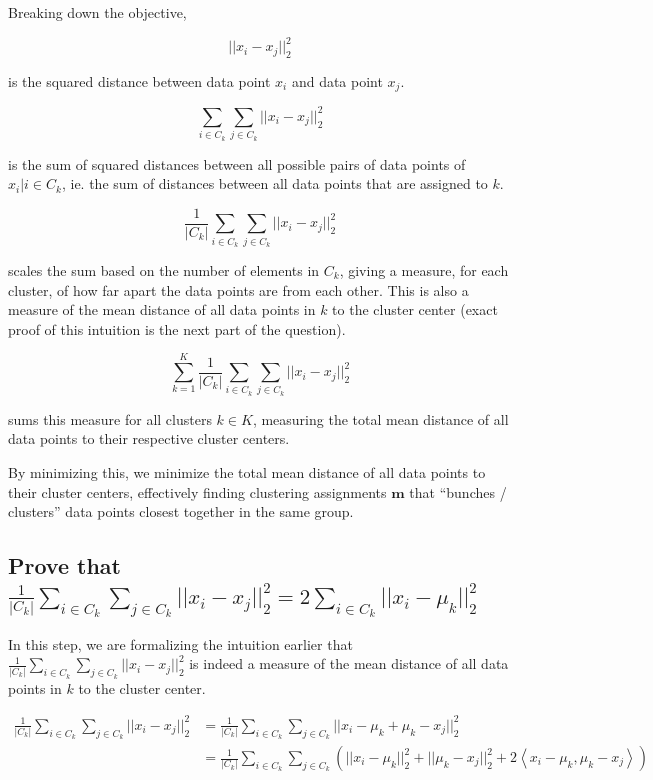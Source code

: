 \documentclass[11pt]{scrartcl}
\begin{document}
Breaking down the objective,

\[||x_i - x_j||^2_2\]

is the squared distance between data point $x_i$ and data point $x_j$.

\[\sum_{i \in C_k} \sum_{j \in C_k}||x_i - x_j||^2_2\]

is the sum of squared distances between all possible pairs of data points of $x_i | i \in C_k$, ie. the sum of distances between all data points that are assigned to $k$.

\[\frac{1}{|C_k|} \sum_{i \in C_k} \sum_{j \in C_k}||x_i - x_j||^2_2\]

scales the sum based on the number of elements in $C_k$, giving a measure, for each cluster, of how far apart the data points are from each other. This is also a measure of the mean distance of all data points in $k$ to the cluster center (exact proof of this intuition is the next part of the question).

\[\sum_{k=1}^K \frac{1}{|C_k|} \sum_{i \in C_k} \sum_{j \in C_k}||x_i - x_j||^2_2\]

sums this measure for all clusters $k \in K$, measuring the total mean distance of all data points to their respective cluster centers.

By minimizing this, we minimize the total mean distance of all data points to their cluster centers, effectively finding clustering assignments $\mathbf{m}$ that ``bunches / clusters'' data points closest together in the same group.

\subsection{Prove that $\frac{1}{|C_k|}\sum_{i \in C_k} \sum_{j \in C_k} ||x_i - x_j||^2_2 = 2 \sum_{i\in C_k} ||x_i - \mu_k||^2_2$}

In this step, we are formalizing the intuition earlier that $\frac{1}{|C_k|}\sum_{i \in C_k} \sum_{j \in C_k} ||x_i - x_j||^2_2$ is indeed a measure of the mean distance of all data points in $k$ to the cluster center. 

\begin{align*}
\frac{1}{|C_k|} \sum_{i \in C_k} \sum_{j \in C_k} ||x_i - x_j||^2_2 &= \frac{1}{|C_k|} \sum_{i \in C_k} \sum_{j \in C_k} ||x_i - \mu_k + \mu_k - x_j||^2_2 \\
&= \frac{1}{|C_k|} \sum_{i \in C_k} \sum_{j \in C_k} \left( ||x_i - \mu_k||^2_2 + ||\mu_k - x_j||^2_2 + 2\left<x_i - \mu_k, \mu_k - x_j\right> \right) \\
\end{align*}
\end{document}
